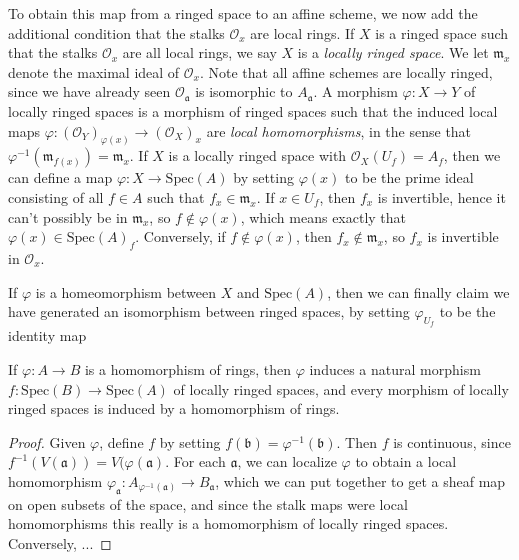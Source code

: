 To obtain this map from a ringed space to an affine scheme, we now add the additional condition that the stalks $\mathcal{O}_x$ are local rings. If $X$ is a ringed space such that the stalks $\mathcal{O}_x$ are all local rings, we say $X$ is a {\it locally ringed space}. We let $\mathfrak{m}_x$ denote the maximal ideal of $\mathcal{O}_x$. Note that all affine schemes are locally ringed, since we have already seen $\mathcal{O}_{\mathfrak{a}}$ is isomorphic to $A_{\mathfrak{a}}$. A morphism $\varphi: X \to Y$ of locally ringed spaces is a morphism of ringed spaces such that the induced local maps $\varphi: (\mathcal{O}_Y)_{\varphi(x)} \to (\mathcal{O}_X)_x$ are {\it local homomorphisms}, in the sense that $\varphi^{-1}(\mathfrak{m}_{f(x)}) = \mathfrak{m}_x$. If $X$ is a locally ringed space with $\mathcal{O}_X(U_f) = A_f$, then we can define a map $\varphi: X \to \text{Spec}(A)$ by setting $\varphi(x)$ to be the prime ideal consisting of all $f \in A$ such that $f_x \in \mathfrak{m}_x$. If $x \in U_f$, then $f_x$ is invertible, hence it can't possibly be in $\mathfrak{m}_x$, so $f \not \in \varphi(x)$, which means exactly that $\varphi(x) \in \text{Spec}(A)_f$. Conversely, if $f \not \in \varphi(x)$, then $f_x \not \in \mathfrak{m}_x$, so $f_x$ is invertible in $\mathcal{O}_x$.

If $\varphi$ is a homeomorphism between $X$ and $\text{Spec}(A)$, then we can finally claim we have generated an isomorphism between ringed spaces, by setting $\varphi_{U_f}$ to be the identity map

\begin{theorem}
    If $\varphi: A \to B$ is a homomorphism of rings, then $\varphi$ induces a natural morphism $f: \text{Spec}(B) \to \text{Spec}(A)$ of locally ringed spaces, and every morphism of locally ringed spaces is induced by a homomorphism of rings.
\end{theorem}
\begin{proof}
    Given $\varphi$, define $f$ by setting $f(\mathfrak{b}) = \varphi^{-1}(\mathfrak{b})$. Then $f$ is continuous, since $f^{-1}(V(\mathfrak{a})) = V(\varphi(\mathfrak{a})$. For each $\mathfrak{a}$, we can localize $\varphi$ to obtain a local homomorphism $\varphi_{\mathfrak{a}}: A_{\varphi^{-1}(\mathfrak{a})} \to B_{\mathfrak{a}}$, which we can put together to get a sheaf map on open subsets of the space, and since the stalk maps were local homomorphisms this really is a homomorphism of locally ringed spaces. Conversely, ...
\end{proof}






